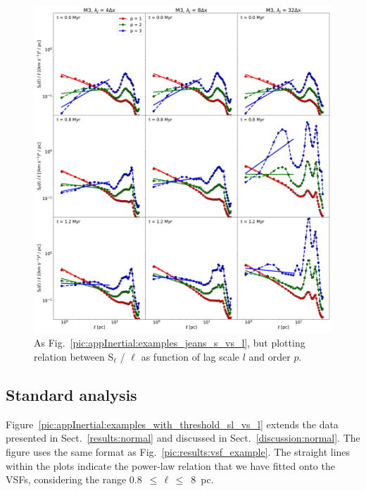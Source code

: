 \documentclass{aa}		%
\begin{document}
 	
\begin{figure}
    \centering
    \includegraphics[width=\textwidth]{app_examples_jeans_sl_l.pdf}
    \caption{
        As Fig.~\ref{pic:appInertial:examples_jeans_s_vs_l}, but plotting relation between S$_{\ell}$ / $\ell$ as function of lag scale $l$ and order $p$.
    }
    \label{pic:appInertial:examples_jeans_sl_vs_l}
\end{figure}

\subsection{Standard analysis}\label{Bsub:standard}

Figure~\ref{pic:appInertial:examples_with_threshold_sl_vs_l} extends the data presented in Sect.~\ref{results:normal} and discussed in Sect.~\ref{discussion:normal}.
The figure uses the same format as Fig.~\ref{pic:results:vsf_example}.
The straight lines within the plots indicate the power-law relation that we have fitted onto the VSFs, considering the range 0.8~$\leq\,\ell\,\leq$~8~pc.
\end{document}
